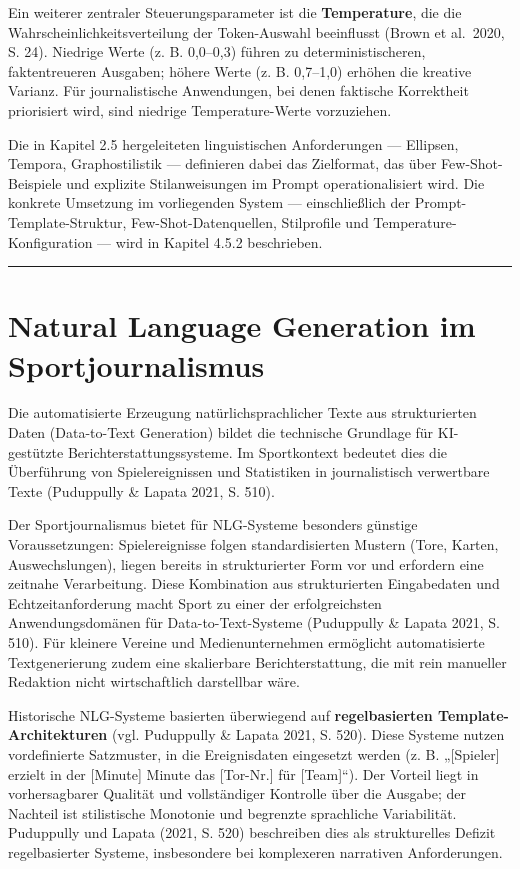 Ein weiterer zentraler Steuerungsparameter ist die \textbf{Temperature},
die die Wahrscheinlichkeitsverteilung der Token-Auswahl beeinflusst
(Brown et al.~2020, S. 24). Niedrige Werte (z. B. 0,0--0,3) führen zu
deterministischeren, faktentreueren Ausgaben; höhere Werte (z. B.
0,7--1,0) erhöhen die kreative Varianz. Für journalistische Anwendungen,
bei denen faktische Korrektheit priorisiert wird, sind niedrige
Temperature-Werte vorzuziehen.

Die in Kapitel 2.5 hergeleiteten linguistischen Anforderungen ---
Ellipsen, Tempora, Graphostilistik --- definieren dabei das Zielformat,
das über Few-Shot-Beispiele und explizite Stilanweisungen im Prompt
operationalisiert wird. Die konkrete Umsetzung im vorliegenden System
--- einschließlich der Prompt-Template-Struktur, Few-Shot-Datenquellen,
Stilprofile und Temperature-Konfiguration --- wird in Kapitel 4.5.2
beschrieben.

\begin{center}\rule{0.5\linewidth}{0.5pt}\end{center}

\section{Natural Language Generation im
Sportjournalismus}\label{natural-language-generation-im-sportjournalismus}

Die automatisierte Erzeugung natürlichsprachlicher Texte aus
strukturierten Daten (Data-to-Text Generation) bildet die technische
Grundlage für KI-gestützte Berichterstattungssysteme. Im Sportkontext
bedeutet dies die Überführung von Spielereignissen und Statistiken in
journalistisch verwertbare Texte (Puduppully \& Lapata 2021, S. 510).

Der Sportjournalismus bietet für NLG-Systeme besonders günstige
Voraussetzungen: Spielereignisse folgen standardisierten Mustern (Tore,
Karten, Auswechslungen), liegen bereits in strukturierter Form vor und
erfordern eine zeitnahe Verarbeitung. Diese Kombination aus
strukturierten Eingabedaten und Echtzeitanforderung macht Sport zu einer
der erfolgreichsten Anwendungsdomänen für Data-to-Text-Systeme
(Puduppully \& Lapata 2021, S. 510). Für kleinere Vereine und
Medienunternehmen ermöglicht automatisierte Textgenerierung zudem eine
skalierbare Berichterstattung, die mit rein manueller Redaktion nicht
wirtschaftlich darstellbar wäre.

Historische NLG-Systeme basierten überwiegend auf \textbf{regelbasierten
Template-Architekturen} (vgl. Puduppully \& Lapata 2021, S. 520). Diese
Systeme nutzen vordefinierte Satzmuster, in die Ereignisdaten eingesetzt
werden (z. B. „{[}Spieler{]} erzielt in der {[}Minute{]} Minute das
{[}Tor-Nr.{]} für {[}Team{]}``). Der Vorteil liegt in vorhersagbarer
Qualität und vollständiger Kontrolle über die Ausgabe; der Nachteil ist
stilistische Monotonie und begrenzte sprachliche Variabilität.
Puduppully und Lapata (2021, S. 520) beschreiben dies als strukturelles
Defizit regelbasierter Systeme, insbesondere bei komplexeren narrativen
Anforderungen.

